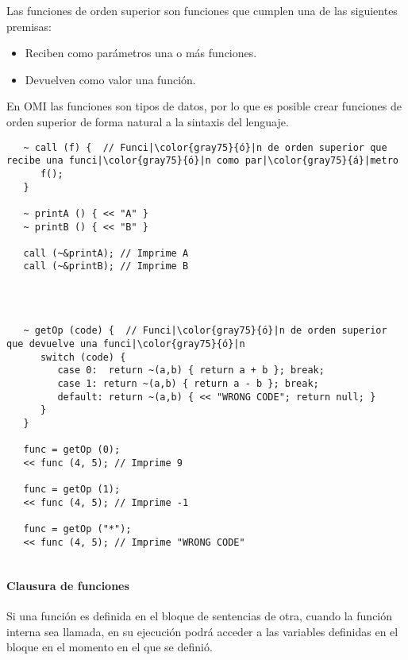 Las funciones de orden superior son funciones que cumplen una de las siguientes premisas:

\begin{itemize}
\item Reciben como parámetros una o más funciones.
\item Devuelven como valor una función.
\end{itemize}

En OMI las funciones son tipos de datos, por lo que es posible crear funciones de orden superior de
forma natural a la sintaxis del lenguaje. \\

\begin{lstlisting}
   ~ call (f) {  // Funci|\color{gray75}{ó}|n de orden superior que recibe una funci|\color{gray75}{ó}|n como par|\color{gray75}{á}|metro
      f();
   }
   
   ~ printA () { << "A" }
   ~ printB () { << "B" }
   
   call (~&printA); // Imprime A
   call (~&printB); // Imprime B
   
\end{lstlisting}

\hfill \\

\begin{lstlisting}
   ~ getOp (code) {  // Funci|\color{gray75}{ó}|n de orden superior que devuelve una funci|\color{gray75}{ó}|n
      switch (code) {
         case 0:  return ~(a,b) { return a + b }; break;
         case 1: return ~(a,b) { return a - b }; break;
         default: return ~(a,b) { << "WRONG CODE"; return null; }
      }
   }
   
   func = getOp (0);
   << func (4, 5); // Imprime 9
   
   func = getOp (1);
   << func (4, 5); // Imprime -1
   
   func = getOp ("*");
   << func (4, 5); // Imprime "WRONG CODE"
   
\end{lstlisting}

\paragraph{Clausura de funciones}
Si una función es definida en el bloque de sentencias de otra, cuando la función interna sea llamada, en su ejecución podrá 
acceder a las variables definidas en el bloque en el momento en el que se definió.


